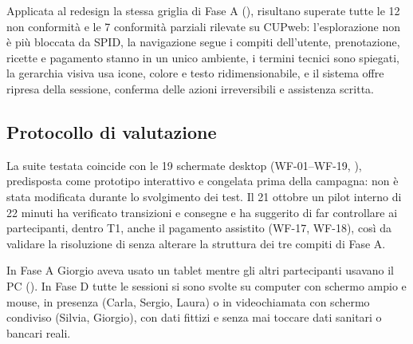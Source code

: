 Applicata al redesign la stessa griglia di Fase A (), risultano superate tutte le 12 non conformità e le 7 conformità parziali rilevate su CUPweb: l'esplorazione non è più bloccata da SPID, la navigazione segue i compiti dell'utente, prenotazione, ricette e pagamento stanno in un unico ambiente, i termini tecnici sono spiegati, la gerarchia visiva usa icone, colore e testo ridimensionabile, e il sistema offre ripresa della sessione, conferma delle azioni irreversibili e assistenza scritta.

\label{doc:d:03}

\subsection{Protocollo di valutazione}


La suite testata coincide con le 19 schermate desktop (WF-01--WF-19, ), predisposta come prototipo interattivo e congelata prima della campagna: non è stata modificata durante lo svolgimento dei test. Il 21 ottobre un pilot interno di 22 minuti ha verificato transizioni e consegne e ha suggerito di far controllare ai partecipanti, dentro T1, anche il pagamento assistito (WF-17, WF-18), così da validare la risoluzione di  senza alterare la struttura dei tre compiti di Fase A.


In Fase A Giorgio aveva usato un tablet mentre gli altri partecipanti usavano il PC (). In Fase D tutte le sessioni si sono svolte su computer con schermo ampio e mouse, in presenza (Carla, Sergio, Laura) o in videochiamata con schermo condiviso (Silvia, Giorgio), con dati fittizi e senza mai toccare dati sanitari o bancari reali.


